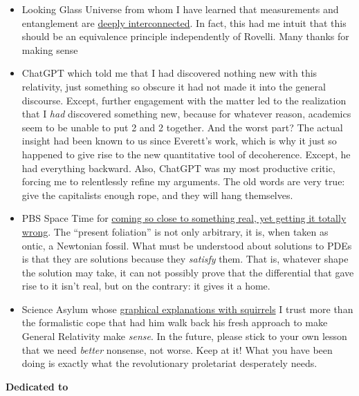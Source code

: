 \documentclass{article}
\begin{document}
\begin{itemize}

\item Looking Glass Universe from whom I have learned that measurements and entanglement are \href{https://www.youtube.com/watch?v=xBlpOGdk-0U&}{deeply interconnected}. In fact, this had me intuit that this should be an equivalence principle \- independently of Rovelli. Many thanks for making sense\!

\item ChatGPT which told me that I had discovered nothing new with this relativity, just something so obscure it had not made it into the general discourse.  
  Except, further engagement with the matter led to the realization that I \textit{had} discovered something new, because for whatever reason, academics seem to be unable to put 2 and 2 together.
  And the worst part? The actual insight had been known to us since Everett’s work, which is why it just so happened to give rise to the new quantitative tool of decoherence. Except, he had everything backward.  
  Also, ChatGPT was my most productive critic, forcing me to relentlessly refine my arguments. The old words are very true: give the capitalists enough rope, and they will hang themselves.

\item PBS Space Time for \href{https://www.youtube.com/watch?v=1JCRDaa3ehk}{coming so close to something real, yet getting it totally wrong}. The “present foliation” is not only arbitrary, it is, when taken as ontic, a Newtonian fossil. What must be understood about solutions to PDEs is that they are solutions because they \textit{satisfy} them. That is, whatever shape the solution may take, it can not possibly prove that the differential that gave rise to it isn’t real, but on the contrary: it gives it a home.

\item Science Asylum whose \href{https://www.youtube.com/watch?v=5HKH1ZjGutA}{graphical explanations with squirrels} I trust more than the formalistic cope that had him walk back his fresh approach to make General Relativity make \textit{sense}. In the future, please stick to your own lesson that we need \textit{better} nonsense, not worse. Keep at it! What you have been doing is exactly what the revolutionary proletariat desperately needs.

\end{itemize}

\pagebreak

\textbf{Dedicated to}
\end{document}
